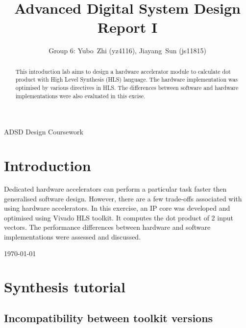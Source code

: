\documentclass[journal]{IEEEtran}
\begin{document}
\title{Advanced Digital System Design Report I}

\author{Group 6: Yubo~Zhi (yz4116), Jiayang~Sun (js11815)}

%
{ADSD Design Coursework}

\maketitle

\begin{abstract}
This introduction lab aims to design a hardware accelerator module to calculate dot product with High Level Synthesis (HLS) language. The hardware implementation was optimised by various directives in HLS. The differences between software and hardware implementations were also evaluated in this excise.
\end{abstract}

\section{Introduction}

Dedicated hardware accelerators can perform a particular task faster then generalised software design. However, there are a few trade-offs associated with using hardware accelerators. In this exercise, an IP core was developed and optimised using Vivado HLS toolkit. It computes the dot product of 2 input vectors. The performance differences between hardware and software implementations were assessed and discussed.



\hfill \today

\section{Synthesis tutorial}
\subsection{Incompatibility between toolkit versions}
\end{document}
